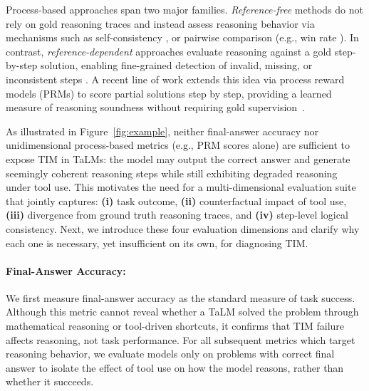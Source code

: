 \documentclass[11pt]{article}
\def \task{\textsc{TIM}\xspace}
\newcommand{\farima}[1]{{\color{orange}Farima: #1}}
\newcommand{\pouya}[1]{{\color{violet}Pouya: #1}}
\begin{document}
Process-based approaches span two major families. \textit{Reference-free} methods do not rely on gold reasoning traces and instead assess reasoning behavior via mechanisms such as self-consistency \cite{liu2025enhancingmathematicalreasoninglarge}, or pairwise comparison (e.g., win rate \citep{chen2025learningreasonfactuality, kim_2024_toolllm}). 
In contrast, \textit{reference-dependent} approaches evaluate reasoning against a gold step-by-step solution, enabling fine-grained detection of invalid, missing, or inconsistent steps \citep{yan2025verifybench, chernyshev2025u}.
A recent line of work extends this idea via process reward models (PRMs) to score partial solutions step by step, providing a learned measure of reasoning soundness without requiring gold supervision~\citep{lightman2023letsverifystepstep, zheng-etal-2025-processbench, li-etal-2025-fg}. 

As illustrated in Figure~\ref{fig:example}, neither final-answer accuracy nor unidimensional process-based metrics (e.g., PRM scores alone) are sufficient to expose \task in TaLMs: the model may output the correct answer and generate seemingly coherent reasoning steps while still exhibiting degraded reasoning under tool use. This motivates the need for a multi-dimensional evaluation suite that jointly captures: \textbf{(i)} task outcome, \textbf{(ii)} counterfactual impact of tool use, \textbf{(iii)} divergence from ground truth reasoning traces, and \textbf{(iv)} step-level logical consistency. Next, we introduce these four evaluation dimensions and clarify why each one is necessary, yet insufficient on its own, for diagnosing \task.

\paragraph{Final-Answer Accuracy:}
\label{sec:final_ans_acc}
We first measure final-answer accuracy as the standard measure of task success.  
Although this metric cannot reveal whether a TaLM solved the problem through mathematical reasoning or tool-driven shortcuts, it confirms that \task failure affects reasoning, not task performance. 
% 
For all subsequent metrics which target reasoning behavior, we evaluate models only on problems with correct final answer to isolate the effect of tool use on how the model reasons, rather than whether it succeeds.
\end{document}
